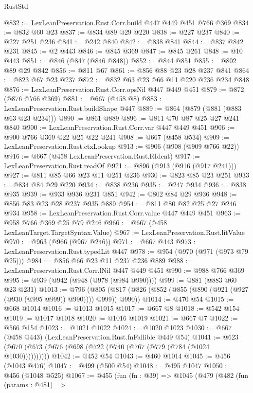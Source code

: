 \begin{lexlean}{RustStd}
\begin{coremodule}
@832 := LexLeanPreservation.Rust.Corr.build @447 @449 @451 @766 @369
@834 := @832 @60 @23
@837 := @834 @89 @29 @220
@838 := @227 @237
@840 := @227 @251 @236
@841 := @242 @840
@842 := @838 @841
@844 := @837 @842 @231
@845 := @2 @443
@846 := @845 @369
@847 := @845 @261
@848 := @10 @443
@851 := @846 (@847 (@846 @848))
@852 := @844 @851
@855 := @802 @89 @29 @842
@856 := @811 @67
@861 := @856 @88 @23 @28 @237 @841
@864 := @823 @67 @23 @237
@872 := @832 @63 @23 @66 @11 @220 @236 @234 @848
@876 := LexLeanPreservation.Rust.Corr.opsNil @447 @449 @451
@879 := @872 (@876 @766 @369)
@881 := @667 (@458 @8)
@883 := LexLeanPreservation.Rust.buildShape @447
@889 := @864 (@879 (@881 (@883 @63 @23 @234)))
@890 := @861 @889
@896 := @811 @70 @87 @25 @27 @241 @840
@900 := LexLeanPreservation.Rust.Corr.var @447 @449 @451
@906 := @900 @766 @369 @22 @25 @22 @241
@908 := @667 (@458 @534)
@909 := LexLeanPreservation.Rust.ctxLookup
@913 := @906 (@908 (@909 @766 @22))
@916 := @667 (@458 LexLeanPreservation.Rust.RIdent)
@917 := LexLeanPreservation.Rust.readOf
@921 := @896 (@913 (@916 (@917 @241)))
@927 := @811 @85 @66 @23 @11 @251 @236
@930 := @823 @85 @23 @251
@933 := @834 @84 @29 @220
@934 := @838 @236
@935 := @247 @934
@936 := @838 @935
@939 := @933 @936 @231 @851
@942 := @802 @84 @29 @936
@948 := @856 @83 @23 @28 @237 @935 @889
@954 := @811 @80 @82 @25 @27 @246 @934
@958 := LexLeanPreservation.Rust.Corr.value @447 @449 @451
@963 := @958 @766 @369 @25 @79 @246
@966 := @667 (@458 LexLeanTarget.TargetSyntax.Value)
@967 := LexLeanPreservation.Rust.litValue
@970 := @963 (@966 (@967 @246))
@971 := @667 @443
@973 := LexLeanPreservation.Rust.typedLit @447
@978 := @954 (@970 (@971 (@973 @79 @25)))
@984 := @856 @66 @23 @11 @237 @236 @889
@988 := LexLeanPreservation.Rust.Corr.lNil @447 @449 @451
@990 := @988 @766 @369
@995 := @939 (@942 (@948 (@978 (@984 @990))))
@999 := @881 (@883 @60 @23 @231)
@1013 := @796
    (@805 (@817 (@826 (@852 (@855 (@890 (@921 (@927 (@930 (@995 @999)) @990)))) @999)) @990))
@1014 := @470 @54
@1015 := @668 @1014
@1016 := @1013 @1015
@1017 := @667 @8
@1018 := @542 @154
@1019 := @1017 @1018
@1020 := @1016 @1019
@1021 := @667 @7
@1022 := @566 @154
@1023 := @1021 @1022
@1024 := @1020 @1023
@1030 := @667 (@458 @443) (LexLeanPreservation.Rust.fnFallible @449 @54)
@1041 := @623 (@670 (@673 (@676 (@698 (@722 (@740 (@767 (@779 (@784 (@1024 @1030))))))))))
@1042 := @452 @54
@1043 := @460 @1014
@1045 := @456 (@1043 @476)
@1047 := @499 (@500 @54)
@1048 := @495 @1047
@1050 := @456 (@1048 @525)
@1067 := @455
    (fun (fn : @39) =>
    @1045
      (@479
        (@482
          (fun (params : @481) =>

\end{coremodule}
\end{lexlean}
